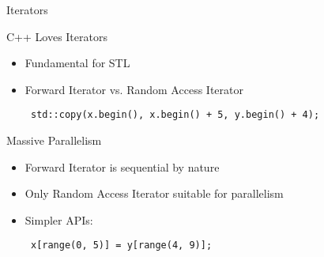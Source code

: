 

\begin{frame}[fragile]{Iterators}

 \begin{block}{C++ Loves Iterators}
  \begin{itemize}
   \item Fundamental for STL
   \item Forward Iterator vs. Random Access Iterator
    \begin{lstlisting}
 std::copy(x.begin(), x.begin() + 5, y.begin() + 4);
    \end{lstlisting}
  \end{itemize}
 \end{block}

 \pause
 \begin{block}{Massive Parallelism}
  \begin{itemize}
   \item Forward Iterator is sequential by nature
   \item Only Random Access Iterator suitable for parallelism
   \item Simpler APIs:
    \begin{lstlisting}
 x[range(0, 5)] = y[range(4, 9)];
    \end{lstlisting}
  \end{itemize}
 \end{block}
 
\end{frame}

